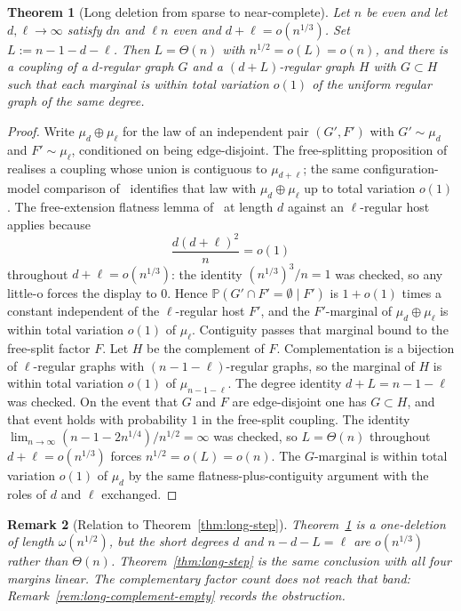 \documentclass[11pt]{article}
\newtheorem{theorem}{Theorem}
\newtheorem{remark}[theorem]{Remark}
\newcommand{\PP}{\mathbb{P}}
\begin{document}
\begin{theorem}[Long deletion from sparse to near-complete]
\label{thm:long-sparse-near-complete}
Let \(n\) be even and let \(d,\ell\to\infty\) satisfy \(dn\) and \(\ell n\) even and
\(d+\ell=o(n^{1/3})\). Set \(L:=n-1-d-\ell\). Then \(L=\Theta(n)\) with
\(n^{1/2}=o(L)=o(n)\), and there is a coupling of a \(d\)-regular graph \(G\) and
a \((d+L)\)-regular graph \(H\) with \(G\subset H\) such that each marginal is
within total variation \(o(1)\) of the uniform regular graph of the same degree.
\end{theorem}

\begin{proof}
Write \(\mu_d\oplus\mu_\ell\) for the law of an independent pair \((G',F')\) with
\(G'\sim\mu_d\) and \(F'\sim\mu_\ell\), conditioned on being edge-disjoint.
The free-splitting proposition of~\cite{PlusOneV1} realises a coupling whose union
is contiguous to \(\mu_{d+\ell}\); the same configuration-model comparison
of~\cite{Wormald99,JLR00} identifies that law with \(\mu_d\oplus\mu_\ell\) up to
total variation \(o(1)\).
The free-extension flatness lemma of~\cite{PlusOneV1} at length \(d\) against an
\(\ell\)-regular host applies because
\[
\frac{d(d+\ell)^2}{n}=o(1)
\]
throughout \(d+\ell=o(n^{1/3})\): the identity \((n^{1/3})^3/n=1\) was checked, so
any little-o forces the display to \(0\).
Hence \(\PP(G'\cap F'=\emptyset\mid F')\) is \(1+o(1)\) times a constant independent
of the \(\ell\)-regular host \(F'\), and the \(F'\)-marginal of \(\mu_d\oplus\mu_\ell\) is
within total variation \(o(1)\) of \(\mu_\ell\).
Contiguity passes that marginal bound to the free-split factor \(F\).
Let \(H\) be the complement of \(F\). Complementation is a bijection of
\(\ell\)-regular graphs with \((n-1-\ell)\)-regular graphs, so the marginal of
\(H\) is within total variation \(o(1)\) of \(\mu_{n-1-\ell}\).
The degree identity \(d+L=n-1-\ell\) was checked.
On the event that \(G\) and \(F\) are edge-disjoint one has \(G\subset H\), and that
event holds with probability \(1\) in the free-split coupling.
The identity \(\lim_{n\to\infty}(n-1-2n^{1/4})/n^{1/2}=\infty\) was checked, so
\(L=\Theta(n)\) throughout \(d+\ell=o(n^{1/3})\) forces \(n^{1/2}=o(L)=o(n)\).
The \(G\)-marginal is within total variation \(o(1)\) of \(\mu_d\) by the same
flatness-plus-contiguity argument with the roles of \(d\) and \(\ell\) exchanged.
\end{proof}

\begin{remark}[Relation to Theorem~\ref{thm:long-step}]
\label{rem:long-sparse-vs-conj}
Theorem~\ref{thm:long-sparse-near-complete} is a one-deletion of length
\(\omega(n^{1/2})\), but the short degrees \(d\) and \(n-d-L=\ell\) are
\(o(n^{1/3})\) rather than \(\Theta(n)\).
Theorem~\ref{thm:long-step} is the same conclusion with all four margins linear.
The complementary factor count does not reach that band:
Remark~\ref{rem:long-complement-empty} records the obstruction.
\end{remark}
\end{document}
